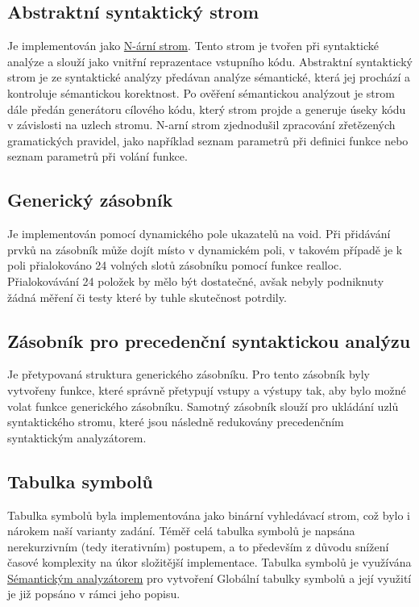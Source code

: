 \documentclass[a4paper, 11pt]{article}
\begin{document}
	\subsection{Abstraktní syntaktický strom}
	\label{abstrtree}
	Je implementován jako \href{https://en.wikipedia.org/wiki/M-ary_tree}{N-ární strom}. Tento strom je tvořen při syntaktické analýze a slouží jako vnitřní 
	reprazentace vstupního kódu. Abstraktní syntaktický strom je ze syntaktické analýzy předávan analýze sémantické, která jej prochází a kontroluje 
	sémantickou korektnost. Po ověření sémantickou analýzout je strom dále předán generátoru cílového kódu, který strom projde a generuje úseky kódu v 
	závislosti na uzlech stromu. N-arní strom zjednodušil zpracování zřetězených gramatických pravidel, jako například seznam parametrů při definici funkce 
	nebo seznam parametrů při volání funkce.

	\subsection{Generický zásobník}
	Je implementován pomocí dynamického pole ukazatelů na void. Při přidávání prvků na zásobník může dojít místo v dynamickém poli, v takovém případě je k 
	poli přialokováno 24 volných slotů zásobníku pomocí funkce realloc. Přialokovávání 24 položek by mělo být dostatečné, avšak nebyly podniknuty žádná 
	měření či testy které by tuhle skutečnost potrdily.
    
	\subsection{Zásobník pro precedenční syntaktickou analýzu}
	Je přetypovaná struktura generického zásobníku. Pro tento zásobník byly vytvořeny funkce, které správně přetypují vstupy a výstupy tak, aby bylo možné 
	volat funkce generického zásobníku. Samotný zásobník slouží pro ukládání uzlů syntaktického stromu, které jsou následně redukovány precedenčním 
	syntaktickým analyzátorem.

	\subsection{Tabulka symbolů}
	\label{symtab}
	Tabulka symbolů byla implementována jako binární vyhledávací strom, což bylo i nárokem naší varianty zadání. Téměř celá tabulka symbolů je napsána 
	nerekurzivním (tedy iterativním) postupem, a to především z důvodu snížení časové komplexity na úkor složitější implementace. Tabulka symbolů je 
	využívána \hyperref[semantic]{Sémantickým analyzátorem} pro vytvoření Globální tabulky symbolů a její využití je již popsáno v rámci jeho popisu.
\end{document}
